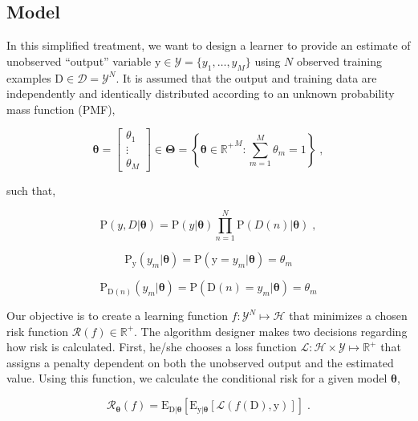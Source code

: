 \documentclass[12pt]{article}
\begin{document}
\subsection{Model}

In this simplified treatment, we want to design a learner to provide an estimate of unobserved ``output'' variable $\mathrm{y} \in \mathcal{Y} = \{ y_1, \ldots, y_M \}$ using $N$ observed training examples $\mathrm{D} \in \mathcal{D} = \mathcal{Y}^N$. It is assumed that the output and training data are independently and identically distributed according to an unknown probability mass function (PMF), 

\begin{equation}
\bm{\theta} = \begin{bmatrix} \theta_1 \\ \vdots \\ \theta_M \end{bmatrix} \in \bm{\Theta} 
= \left\{ \bm{\theta} \in {\mathbb{R}^+}^M: \sum_{m=1}^M \theta_m = 1 \right\} \;,
\end{equation}

such that,

\begin{equation}
\text{P}(y,D | \bm{\theta}) = \text{P}(y | \bm{\theta}) \prod_{n=1}^N \text{P}(D(n) | \bm{\theta}) \;,
\end{equation}

\begin{equation}
\text{P}_{\mathrm{y}}(y_m|\bm{\theta}) = \text{P}(\mathrm{y} = y_m | \bm{\theta}) = \theta_m
\end{equation}

\begin{equation}
\text{P}_{\mathrm{D}(n)}(y_m|\bm{\theta}) = \text{P}(\mathrm{D}(n) = y_m | \bm{\theta}) = \theta_m
\end{equation}


Our objective is to create a learning function $f: \mathcal{Y}^N \mapsto \mathcal{H}$ that minimizes a chosen risk function $\mathcal{R}(f) \in \mathbb{R}^+$.  The algorithm designer makes two decisions regarding how risk is calculated. First, he/she chooses a loss function $\mathcal{L}: \mathcal{H} \times \mathcal{Y} \mapsto \mathbb{R}^+$ that assigns a penalty dependent on both the unobserved output and the estimated value. Using this function, we calculate the conditional risk for a given model $\bm{\theta}$,

\begin{equation}
\mathcal{R}_{\bm{\theta}}(f) = \text{E}_{\mathrm{D}|\bm{\theta}} \left[ \text{E}_{\mathrm{y}|\bm{\theta}} \left[ \mathcal{L}(f(\mathrm{D}),\mathrm{y}) \right] \right] \;.
\end{equation}
\end{document}
